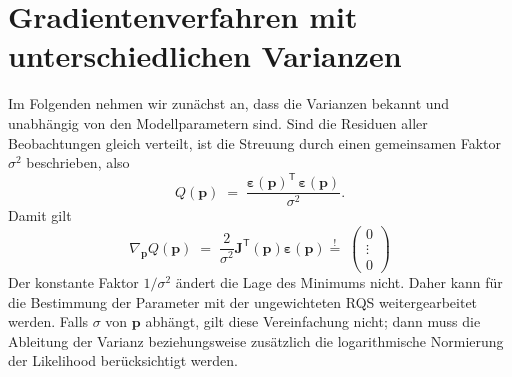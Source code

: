 \section{Gradientenverfahren mit unterschiedlichen Varianzen}
\label{unterschiedVar}
Im Folgenden nehmen wir zunächst an, dass die Varianzen bekannt und unabhängig von
den Modellparametern sind. Sind die Residuen aller Beobachtungen gleich verteilt,
ist die Streuung durch einen gemeinsamen Faktor $\sigma^2$ beschrieben, also
\begin{equation}
Q(\mathbf{p}) \; = \;
 \frac{\boldsymbol{\varepsilon}(\mathbf{p})^\mathsf{T} \,
 \boldsymbol{\varepsilon}(\mathbf{p})}{\sigma^2}.
\end{equation}
Damit gilt
\begin{equation}
\nabla_{\mathbf{p}} Q(\mathbf{p})  \; = \;
\frac{2}{\sigma^2} \boldsymbol{J}^\mathsf{T}(\mathbf{p})
 \boldsymbol{\varepsilon}(\mathbf{p})
\overset{!}{=} \; \left(\begin{array}{c} 0 \\ \vdots \\ 0 \end{array}\right)
\label{ZielfunktionalGradJmitSigma}
\end{equation}
Der konstante Faktor $1/\sigma^2$ ändert die Lage des Minimums nicht. Daher kann
für die Bestimmung der Parameter mit der ungewichteten RQS weitergearbeitet werden.
Falls $\sigma$ von $\mathbf p$ abhängt, gilt diese Vereinfachung nicht; dann muss
die Ableitung der Varianz beziehungsweise zusätzlich die logarithmische
Normierung der Likelihood berücksichtigt werden.

